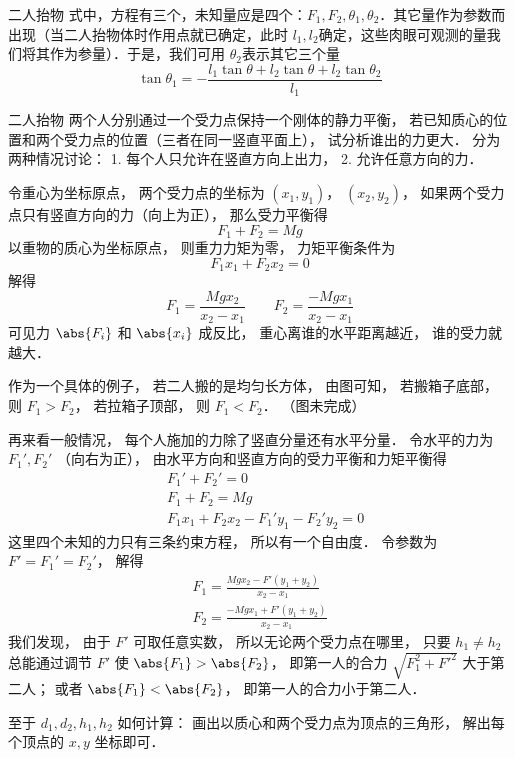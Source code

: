 \begin{example}{二人抬物}
式中，方程有三个，未知量应是四个：$F_1,F_2,\theta_1,\theta_2$．其它量作为参数而出现（当二人抬物体时作用点就已确定，此时 $l_1,l_2$确定，这些肉眼可观测的量我们将其作为参量）．于是，我们可用 $\theta_2$表示其它三个量
\begin{equation}
\tan\theta_1=-\frac {l_1
 \tan  \theta +l_2\tan\theta +l_2\tan
\theta_2}{l_1}
\end{equation}
\end{example}

\begin{example}{二人抬物}
两个人分别通过一个受力点保持一个刚体的静力平衡， 若已知质心的位置和两个受力点的位置（三者在同一竖直平面上）， 试分析谁出的力更大． 分为两种情况讨论： 1. 每个人只允许在竖直方向上出力， 2. 允许任意方向的力．

令重心为坐标原点， 两个受力点的坐标为 $(x_1, y_1)$， $(x_2, y_2)$， 如果两个受力点只有竖直方向的力（向上为正）， 那么受力平衡得
\begin{equation}
F_1 + F_2 = Mg
\end{equation}
以重物的质心为坐标原点， 则重力力矩为零， 力矩平衡条件为
\begin{equation}
F_1 x_1 + F_2 x_2 = 0
\end{equation}
解得
\begin{equation}
F_1 = \frac{Mg x_2}{x_2 - x_1} \qquad F_2 = \frac{-Mg x_1}{x_2 - x_1}
\end{equation}
可见力 $\abs{F_i}$ 和 $\abs{x_i}$ 成反比， 重心离谁的水平距离越近， 谁的受力就越大．

作为一个具体的例子， 若二人搬的是均匀长方体， 由图可知， 若搬箱子底部， 则 $F_1 > F_2$， 若拉箱子顶部， 则 $F_1 < F_2$． （图未完成）

再来看一般情况， 每个人施加的力除了竖直分量还有水平分量． 令水平的力为 $F_1', F_2'$ （向右为正）， 由水平方向和竖直方向的受力平衡和力矩平衡得
\begin{equation}
\begin{aligned}
&F_1' + F_2' = 0\\
&F_1 + F_2 = Mg\\
&F_1 x_1 + F_2 x_2 - F_1' y_1 - F_2' y_2 = 0
\end{aligned}
\end{equation}
这里四个未知的力只有三条约束方程， 所以有一个自由度． 令参数为 $F' = F_1' = F_2'$， 解得
\begin{equation}
\begin{aligned}
F_1 = \frac{Mg x_2 - F'(y_1 + y_2)}{x_2 - x_1}\\
F_2 = \frac{-Mg x_1 + F'(y_1 + y_2)}{x_2 - x_1}
\end{aligned}
\end{equation}
我们发现， 由于 $F'$ 可取任意实数， 所以无论两个受力点在哪里， 只要 $h_1 \ne h_2$ 总能通过调节 $F'$ 使 $\abs{F_1} > \abs{F_2}$， 即第一人的合力 $\sqrt{F_1^2 + F'^2}$ 大于第二人； 或者 $\abs{F_1} < \abs{F_2}$， 即第一人的合力小于第二人．

至于 $d_1, d_2, h_1, h_2$ 如何计算： 画出以质心和两个受力点为顶点的三角形， 解出每个顶点的 $x, y$ 坐标即可．
\end{example}
